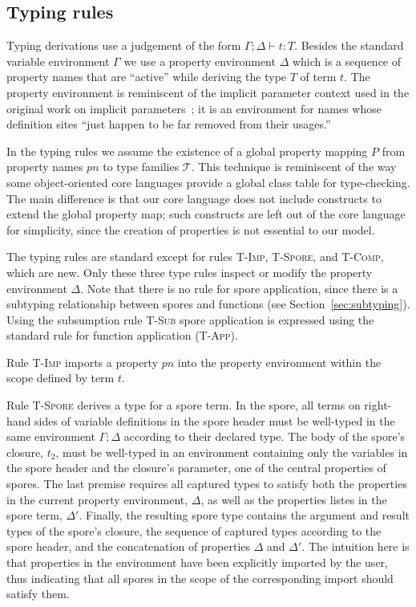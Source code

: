 \documentclass{llncs}
\begin{document}
\subsection{Typing rules}\label{sec:typing}

Typing derivations use a judgement of the form $\Gamma ; \Delta \vdash t : T$. Besides the standard variable environment $\Gamma$ we use a property environment $\Delta$ which is a sequence of property names that are ``active'' while deriving the type $T$ of term $t$. The property environment is reminiscent of the implicit parameter context used in the original work on implicit parameters~\cite{LewisLMS00}; it is an environment for names whose definition sites ``just happen to be far removed from their usages.''

In the typing rules we assume the existence of a global property mapping $P$ from property names $pn$ to type families $\mathcal{T}$. This technique is reminiscent of the way some object-oriented core languages provide a global class table for type-checking. The main difference is that our core language does not include constructs to extend the global property map; such constructs are left out of the core language for simplicity, since the creation of properties is not essential to our model.

The typing rules are standard except for rules \textsc{T-Imp}, \textsc{T-Spore}, and \textsc{T-Comp}, which are new. Only these three type rules inspect or modify the property environment $\Delta$. Note that there is no rule for spore application, since there is a subtyping relationship between spores and functions (see Section~\ref{sec:subtyping}). Using the subsumption rule \textsc{T-Sub} spore application is expressed using the standard rule for function application (\textsc{T-App}).

Rule \textsc{T-Imp} imports a property $pn$ into the property environment within the scope defined by term $t$.

Rule \textsc{T-Spore} derives a type for a spore term. In the spore, all terms on right-hand sides of variable definitions in the spore header must be well-typed in the same environment $\Gamma ; \Delta$ according to their declared type. The body of the spore's closure, $t_2$, must be well-typed in an environment containing only the variables in the spore header and the closure's parameter, one of the central properties of spores. The last premise requires all captured types to satisfy both the properties in the current property environment, $\Delta$, as well as the properties listes in the spore term, $\Delta'$. Finally, the resulting spore type contains the argument and result types of the spore's closure, the sequence of captured types according to the spore header, and the concatenation of properties $\Delta$ and $\Delta'$. The intuition here is that properties in the environment have been explicitly imported by the user, thus indicating that all spores in the scope of the corresponding import should satisfy them.
\end{document}
